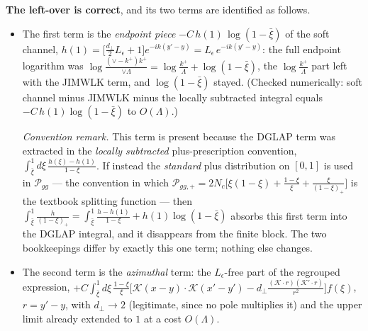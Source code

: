 \documentclass[10pt]{article}
\newcommand{\Leps}{L_{\epsilon}}
\newcommand{\KK}{\mathcal K(x-y)\!\cdot\!\mathcal K(x'-y')}
\begin{document}
\textbf{The left-over is correct}, and its two terms are identified as follows.
\begin{itemize}
\item[(a)] The first term is the \emph{endpoint piece} $-C\,h(1)\,\log(1-\bar\xi)$ of the soft
channel, $h(1)=\big[\frac{d_{\perp}}{2}\Leps+1\big]e^{-ik(y'-y)}=\Leps\,e^{-ik(y'-y)}$: the full
endpoint logarithm was $\log\frac{(\vee-k^{+})k^{+}}{\vee\Lambda}
={\log\frac{k^{+}}{\Lambda}}+\log(1-\bar\xi)$, the $\log\frac{k^{+}}{\Lambda}$ part left with
the JIMWLK term, and $\log(1-\bar\xi)$ stayed. (Checked numerically: soft channel minus JIMWLK
minus the locally subtracted integral equals $-C\,h(1)\log(1-\bar\xi)$ to $O(\Lambda)$.)

\emph{Convention remark.} This term is present because the DGLAP term was extracted in the
\emph{locally subtracted} plus-prescription convention,
$\int_{\bar\xi}^{1}d\xi\,\frac{h(\xi)-h(1)}{1-\xi}$. If instead the \emph{standard} plus
distribution on $[0,1]$ is used in $\mathcal P_{gg}$ --- the convention in which
$\mathcal P_{gg,+}=2N_{c}\big[\xi(1-\xi)+\frac{1-\xi}{\xi}+\frac{\xi}{(1-\xi)_{+}}\big]$ is the
textbook splitting function --- then
$\int_{\bar\xi}^{1}\frac{h}{(1-\xi)_{+}}=\int_{\bar\xi}^{1}\frac{h-h(1)}{1-\xi}
+h(1)\log(1-\bar\xi)$ absorbs this first term into the DGLAP integral, and it disappears from
the finite block. The two bookkeepings differ by exactly this one term; nothing else changes.
\item[(b)] The second term is the \emph{azimuthal} term: the $\Leps$-free part of the regrouped
expression, $+C\int_{\bar\xi}^{1}d\xi\,\frac{1-\xi}{\xi}
\big[\KK-d_{\perp}\frac{(\mathcal K\cdot r)(\mathcal K'\cdot r)}{r^{2}}\big]f(\xi)$,
$r=y'-y$, with $d_{\perp}\to2$ (legitimate, since no pole multiplies it) and the upper limit
already extended to $1$ at a cost $O(\Lambda)$.
\end{itemize}
\end{document}

